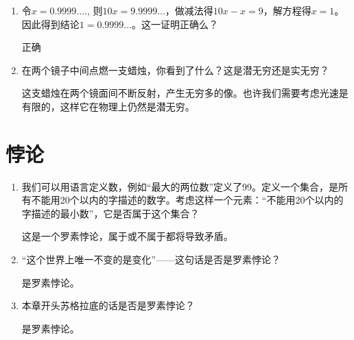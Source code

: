 \documentclass[UTF8]{article}
\begin{document}
\begin{Exercise}
\end{Exercise}

\begin{enumerate}
\item 令$x = 0.9999....$, 则$10x = 9.9999...$，做减法得$10x - x = 9$，解方程得$x = 1$。因此得到结论$1 = 0.9999...$。这一证明正确么？

正确

\item 在两个镜子中间点燃一支蜡烛，你看到了什么？这是潜无穷还是实无穷？

这支蜡烛在两个镜面间不断反射，产生无穷多的像。也许我们需要考虑光速是有限的，这样它在物理上仍然是潜无穷。

\end{enumerate}

\section{悖论}

\begin{enumerate}
\item {我们可以用语言定义数，例如“最大的两位数”定义了99。定义一个集合，是所有不能用20个以内的字描述的数字。考虑这样一个元素：“不能用20个以内的字描述的最小数”，它是否属于这个集合？}

这是一个罗素悖论，属于或不属于都将导致矛盾。

\item {“这个世界上唯一不变的是变化”——这句话是否是罗素悖论？}

是罗素悖论。

\item {本章开头苏格拉底的话是否是罗素悖论？}

是罗素悖论。

\end{enumerate}

\begin{Exercise}
\end{Exercise}
\end{document}
